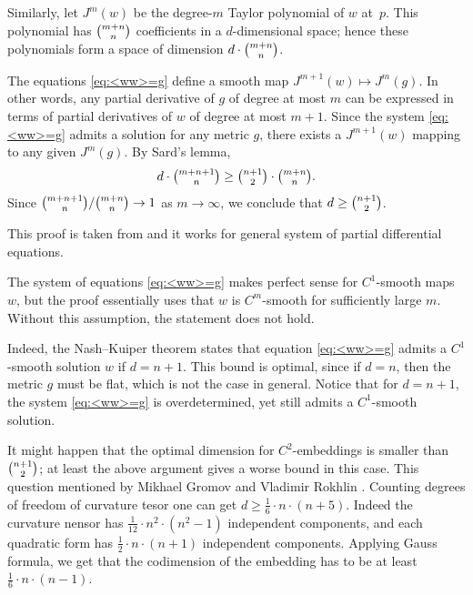 Similarly, let $J^m(w)$ be the degree-$m$ Taylor polynomial of $w$ at~$p$.
This polynomial has $\tbinom{m+n}{n}$ coefficients in a $d$-dimensional space;
hence these polynomials form a space of dimension $d \cdot \tbinom{m+n}{n}$.

The equations \ref{eq:<ww>=g} define a smooth map $J^{m+1}(w)\mapsto J^m(g)$.
In other words, any partial derivative of $g$ of degree at most $m$ can be expressed in terms of partial derivatives of $w$ of degree at most $m+1$.
Since the system \ref{eq:<ww>=g} admits a solution for any metric $g$, there exists a $J^{m+1}(w)$ mapping to any given $J^m(g)$.
By Sard's lemma,
\[
d \cdot \tbinom{m+n+1}{n} \ge \tbinom{n+1}{2} \cdot  \tbinom{m+n}{n}.
\]
Since
$\tbinom{m+n+1}{n}/\tbinom{m+n}{n} \to 1$ as  $m \to \infty$, we conclude that $d \ge \tbinom{n+1}{2}$.
\qeds

This proof is taken from \cite[Appendix I]{gromov-rokhlin} and it works for general system of partial differential equations.

The system of equations \ref{eq:<ww>=g} makes perfect sense for $C^1$-smooth maps $w$, but the proof essentially uses that $w$ is $C^m$-smooth for sufficiently large $m$.
Without this assumption, the statement does not hold.

Indeed, the Nash--Kuiper theorem \cite{nash-1954,kuiper-1955} states that equation \ref{eq:<ww>=g} admits a $C^1$-smooth solution $w$ if $d = n+1$.
This bound is optimal, since if $d=n$, then the metric $g$ must be flat, which is not the case in general.
Notice that for $d = n+1$, the system \ref{eq:<ww>=g} is overdetermined, yet still admits a $C^1$-smooth solution.

It might happen that the optimal dimension for $C^2$-embeddings is smaller than $\tbinom{n+1}{2}$;
at least the above argument gives a worse bound in this case.
This question mentioned by Mikhael Gromov and Vladimir Rokhlin \cite[]{gromov-rokhlin}.
Counting degrees of freedom of curvature tesor one can get $d\ge \tfrac1{6}\cdot n\cdot (n+5)$.
Indeed the curvature nensor has $\tfrac1{12}\cdot n^2\cdot(n^2-1)$ independent components, and each quadratic form has $\tfrac12\cdot n\cdot(n+1)$ independent components.
Applying Gauss formula, we get that the codimension of the embedding has to be at least $\tfrac1{6}\cdot n\cdot (n-1)$.











